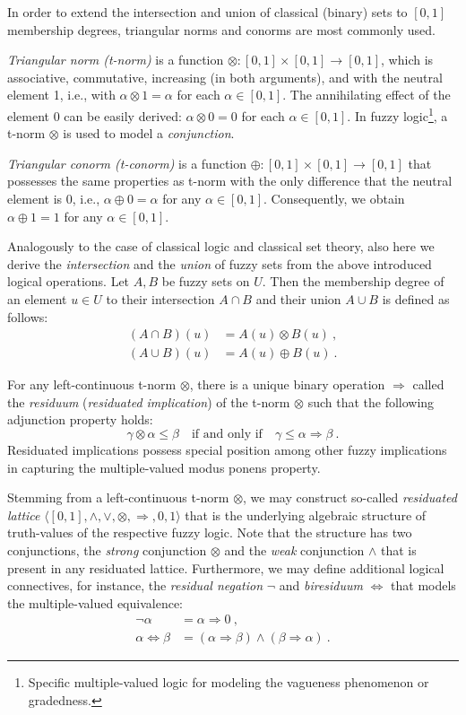 \documentclass[review]{elsarticle}
\begin{document}
In order to extend the intersection and union of classical (binary) sets to $[0,1]$ membership degrees, triangular norms and conorms are most commonly used. 

\emph{Triangular norm (t-norm)} is a function $\otimes: [0,1] \times [0,1] \to [0,1]$,
which is associative, commutative, increasing (in both
arguments), and with the neutral element 1, i.e., with $\alpha \otimes 1 = \alpha$ for each $\alpha \in [0, 1]$. The annihilating effect of the element 0 can be easily derived: $\alpha \otimes 0 = 0$ for each $\alpha \in [0, 1]$. In fuzzy logic\footnote{Specific multiple-valued logic for modeling the vagueness phenomenon or gradedness.}, a t-norm $\otimes$ is used to model a \emph{conjunction}.

\emph{Triangular conorm (t-conorm)} is a function $\oplus: [0,1] \times [0,1] \to [0,1]$ that possesses the same properties as t-norm with the only difference that the neutral element is 0, i.e., $\alpha \oplus 0 = \alpha$ for any $\alpha \in [0,1]$. Consequently, we obtain $\alpha \oplus 1 = 1$ for any $\alpha \in [0,1]$.
  
Analogously to the case of classical logic and classical set theory, also here we derive the \emph{intersection} and the \emph{union} of fuzzy sets from the above introduced logical operations. Let $A, B$ be fuzzy sets on $U$. Then the membership degree of an element $u\in U$ to their intersection
$A \cap B$ and their union $A\cup B$ is defined as follows:
\begin{align*}
    (A\cap B)(u) &= A(u) \otimes B(u) \ , \\
    (A\cup B)(u) &= A(u) \oplus B(u) \ .
\end{align*}


For any left-continuous t-norm $\otimes$, there is a unique binary operation $\Rightarrow$
called the \emph{residuum} (\emph{residuated implication}) of the t-norm $\otimes$ such that the following adjunction property holds:
%
$$\gamma \otimes \alpha \le \beta\quad\textrm{if and only if}\quad \gamma \le \alpha \Rightarrow \beta \ . $$
%
Residuated implications possess special position among other fuzzy implications \citep{Baczynski_Jayaram_2008c} in capturing the multiple-valued modus ponens property. 

Stemming from a left-continuous t-norm $\otimes$, we may construct so-called \emph{residuated lattice} $\langle [0,1], \wedge, \vee, \otimes , \Rightarrow , 0 , 1 \rangle$ that is the underlying algebraic structure of truth-values of the respective fuzzy logic. Note that the structure has two conjunctions, the \emph{strong} conjunction $\otimes$ and the \emph{weak} conjunction $\wedge$ that is present in any residuated lattice. Furthermore, we may define additional logical connectives, for instance, the \emph{residual negation} $\lnot$
and \emph{biresiduum}  $\Leftrightarrow$ that models the multiple-valued equivalence:
%
\begin{align*}
\lnot\alpha &= \alpha \Rightarrow 0 \ , \\
\alpha \Leftrightarrow \beta &= (\alpha \Rightarrow \beta) \wedge (\beta \Rightarrow \alpha)\ .
\end{align*}
\end{document}
